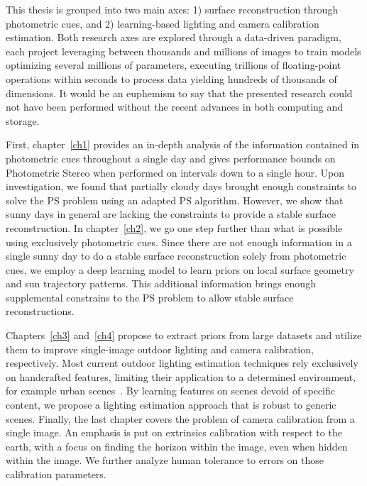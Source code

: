This thesis is grouped into two main axes: 1) surface reconstruction through photometric cues, and 2) learning-based lighting and camera calibration estimation. Both research axes are explored through a data-driven paradigm, each project leveraging between thousands and millions of images to train models optimizing several millions of parameters, executing trillions of floating-point operations within seconds to process data yielding hundreds of thousands of dimensions. It would be an euphemism to say that the presented research could not have been performed without the recent advances in both computing and storage.

First, chapter~\ref{ch1} provides an in-depth analysis of the information contained in photometric cues throughout a single day and gives performance bounds on Photometric Stereo when performed on intervals down to a single hour. Upon investigation, we found that partially cloudy days brought enough constraints to solve the PS problem using an adapted PS algorithm. However, we show that sunny days in general are lacking the constraints to provide a stable surface reconstruction. In chapter~\ref{ch2}, we go one step further than what is possible using exclusively photometric cues. Since there are not enough information in a single sunny day to do a stable surface reconstruction solely from photometric cues, we employ a deep learning model to learn priors on local surface geometry and sun trajectory patterns. This additional information brings enough supplemental constrains to the PS problem to allow stable surface reconstructions.

Chapters~\ref{ch3} and~\ref{ch4} propose to extract priors from large datasets and utilize them to improve single-image outdoor lighting and camera calibration, respectively. Most current outdoor lighting estimation techniques rely exclusively on handcrafted features, limiting their application to a determined environment, for example urban scenes~\cite{lalonde-ijcv-12}. By learning features on scenes devoid of specific content, we propose a lighting estimation approach that is robust to generic scenes. Finally, the last chapter covers the problem of camera calibration from a single image. An emphasis is put on extrinsics calibration with respect to the earth, with a focus on finding the horizon within the image, even when hidden within the image. We further analyze human tolerance to errors on those calibration parameters.








